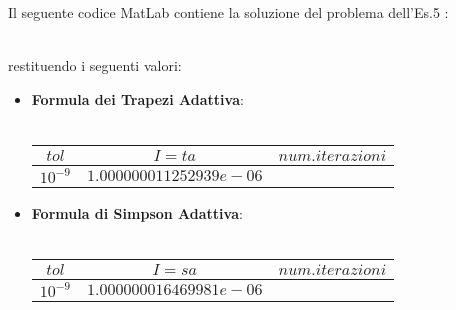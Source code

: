 Il seguente codice MatLab contiene la soluzione del problema dell'Es.5 :\\\
	
restituendo i seguenti valori:
\begin{itemize}
	\item
		\textbf{Formula dei Trapezi Adattiva}:\\\
		\begin{center}
		\begin{tabular}{|c|c|c|}
			\hline
				$tol$ & $I=ta$ & $num. iterazioni$ \\
    			\hline
    				$10^{-9}$ & $1.000000011252939e-06$ & \\
				\hline
		\end{tabular}
		\end{center}
	\item
		\textbf{Formula di Simpson Adattiva}:\\\
				\begin{center}
		\begin{tabular}{|c|c|c|}
			\hline
				$tol$ & $I=sa$ & $num. iterazioni$ \\
    			\hline
    				$10^{-9}$ & $1.000000016469981e-06$ & \\
				\hline
		\end{tabular}
		\end{center}
\end{itemize}
